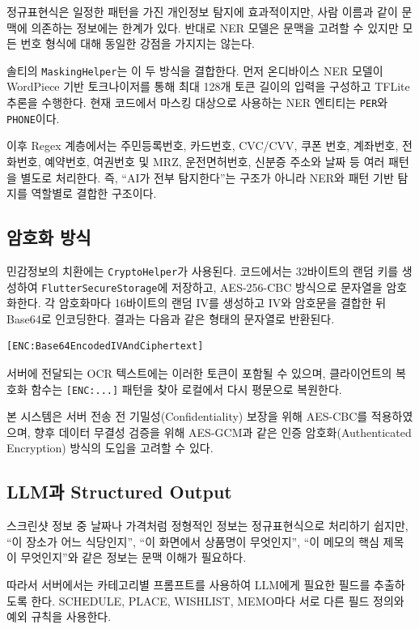 \documentclass[11pt,a4paper]{article}
\begin{document}
정규표현식은 일정한 패턴을 가진 개인정보 탐지에 효과적이지만, 사람 이름과 같이 문맥에 의존하는 정보에는 한계가 있다. 반대로 NER 모델은 문맥을 고려할 수 있지만 모든 번호 형식에 대해 동일한 강점을 가지지는 않는다.

솔티의 \texttt{MaskingHelper}는 이 두 방식을 결합한다. 먼저 온디바이스 NER 모델이 WordPiece 기반 토크나이저를 통해 최대 128개 토큰 길이의 입력을 구성하고 TFLite 추론을 수행한다. 현재 코드에서 마스킹 대상으로 사용하는 NER 엔티티는 \texttt{PER}와 \texttt{PHONE}이다.

이후 Regex 계층에서는 주민등록번호, 카드번호, CVC/CVV, 쿠폰 번호, 계좌번호, 전화번호, 예약번호, 여권번호 및 MRZ, 운전면허번호, 신분증 주소와 날짜 등 여러 패턴을 별도로 처리한다. 즉, ``AI가 전부 탐지한다''는 구조가 아니라 NER와 패턴 기반 탐지를 역할별로 결합한 구조이다.

\subsection{암호화 방식}

민감정보의 치환에는 \texttt{CryptoHelper}가 사용된다. 코드에서는 32바이트의 랜덤 키를 생성하여 \texttt{FlutterSecureStorage}에 저장하고, AES-256-CBC 방식으로 문자열을 암호화한다. 각 암호화마다 16바이트의 랜덤 IV를 생성하고 IV와 암호문을 결합한 뒤 Base64로 인코딩한다. 결과는 다음과 같은 형태의 문자열로 반환된다.

\begin{lstlisting}
[ENC:Base64EncodedIVAndCiphertext]
\end{lstlisting}

서버에 전달되는 OCR 텍스트에는 이러한 토큰이 포함될 수 있으며, 클라이언트의 복호화 함수는 \texttt{[ENC:...]} 패턴을 찾아 로컬에서 다시 평문으로 복원한다.

본 시스템은 서버 전송 전 기밀성(Confidentiality) 보장을 위해 AES-CBC를 적용하였으며, 향후 데이터 무결성 검증을 위해 AES-GCM과 같은 인증 암호화(Authenticated Encryption) 방식의 도입을 고려할 수 있다.

\subsection{LLM과 Structured Output}

스크린샷 정보 중 날짜나 가격처럼 정형적인 정보는 정규표현식으로 처리하기 쉽지만, ``이 장소가 어느 식당인지'', ``이 화면에서 상품명이 무엇인지'', ``이 메모의 핵심 제목이 무엇인지''와 같은 정보는 문맥 이해가 필요하다.

따라서 서버에서는 카테고리별 프롬프트를 사용하여 LLM에게 필요한 필드를 추출하도록 한다. SCHEDULE, PLACE, WISHLIST, MEMO마다 서로 다른 필드 정의와 예외 규칙을 사용한다.
\end{document}

